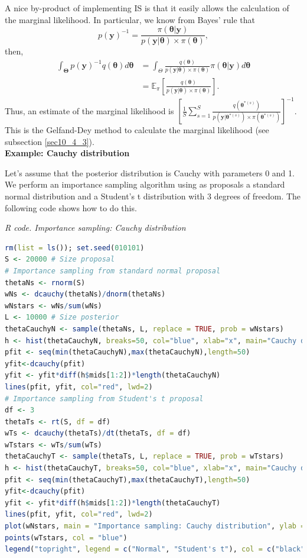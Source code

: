 A nice by-product of implementing IS is that it easily allows the calculation of the marginal likelihood. In particular, we know from Bayes' rule that
$$p(\bm{y})^{-1}=\frac{\pi(\bm{\theta}|\bm{y})}{p(\bm{y}|\bm{\theta})\times \pi(\bm{\theta})},$$
then, 
\begin{align*}
	\int_{\bm{\Theta}}p(\bm{y})^{-1}q(\bm{\theta})d\bm{\theta}&=\int_{{\Theta}}\frac{q(\bm{\theta})}{p(\bm{y}|\bm{\theta})\times \pi(\bm{\theta})}\pi(\bm{\theta}|\bm{y})d\bm{\theta}\\
	&=\mathbb{E}_{\pi}\left[\frac{q(\bm{\theta})}{p(\bm{y}|\bm{\theta})\times \pi(\bm{\theta})}\right].
\end{align*}
Thus, an estimate of the marginal likelihood is $\left[\frac{1}{S}\sum_{s=1}^S\frac{q(\bm{\theta}^{*(s)})}{p(\bm{y}|\bm{\theta}^{*(s)})\times\pi(\bm{\theta}^{*(s)})}\right]^{-1}$. This is the Gelfand-Dey method to calculate the marginal likelihood \cite{gelfand1994bayesian} (see subsection \ref{sec10_4_3}).\\

\textbf{Example: Cauchy distribution}

Let's assume that the posterior distribution is Cauchy with parameters 0 and 1. We perform an importance sampling algorithm using as proposals a standard normal distribution and a Student's t distribution with 3 degrees of freedom. The following code shows how to do this.

\begin{tcolorbox}[enhanced,width=4.67in,center upper,
	fontupper=\large\bfseries,drop shadow southwest,sharp corners]
	\textit{R code. Importance sampling: Cauchy distribution}
	\begin{VF}
		\begin{lstlisting}[language=R]
rm(list = ls()); set.seed(010101)
S <- 20000 # Size proposal
# Importance sampling from standard normal proposal 
thetaNs <- rnorm(S)
wNs <- dcauchy(thetaNs)/dnorm(thetaNs)
wNstars <- wNs/sum(wNs)
L <- 10000 # Size posterior
thetaCauchyN <- sample(thetaNs, L, replace = TRUE, prob = wNstars)
h <- hist(thetaCauchyN, breaks=50, col="blue", xlab="x", main="Cauchy draws from importance sampling: Normal standard proposal")
pfit <- seq(min(thetaCauchyN),max(thetaCauchyN),length=50)
yfit<-dcauchy(pfit)
yfit <- yfit*diff(h$mids[1:2])*length(thetaCauchyN)
lines(pfit, yfit, col="red", lwd=2)
# Importance sampling from Student's t proposal 
df <- 3
thetaTs <- rt(S, df = df)
wTs <- dcauchy(thetaTs)/dt(thetaTs, df = df)
wTstars <- wTs/sum(wTs)
thetaCauchyT <- sample(thetaTs, L, replace = TRUE, prob = wTstars)
h <- hist(thetaCauchyT, breaks=50, col="blue", xlab="x", main="Cauchy draws from importance sampling: Student's t proposal")
pfit <- seq(min(thetaCauchyT),max(thetaCauchyT),length=50)
yfit<-dcauchy(pfit)
yfit <- yfit*diff(h$mids[1:2])*length(thetaCauchyT)
lines(pfit, yfit, col="red", lwd=2)
plot(wNstars, main = "Importance sampling: Cauchy distribution", ylab = "Weights", xlab = "Iterations")
points(wTstars, col = "blue")
legend("topright", legend = c("Normal", "Student's t"), col = c("black", "blue"), pch = c(1, 1))
\end{lstlisting}
	\end{VF}
\end{tcolorbox} 

